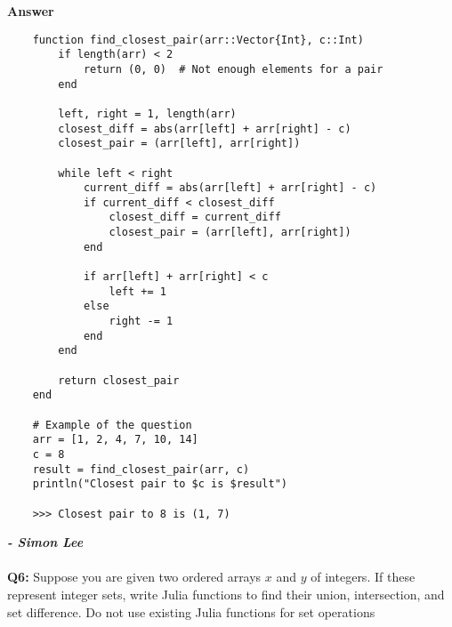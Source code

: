 \documentclass{article}
\begin{document}
\textbf{Answer}

\begin{verbatim}
    function find_closest_pair(arr::Vector{Int}, c::Int)
        if length(arr) < 2
            return (0, 0)  # Not enough elements for a pair
        end
        
        left, right = 1, length(arr)
        closest_diff = abs(arr[left] + arr[right] - c)
        closest_pair = (arr[left], arr[right])
        
        while left < right
            current_diff = abs(arr[left] + arr[right] - c)
            if current_diff < closest_diff
                closest_diff = current_diff
                closest_pair = (arr[left], arr[right])
            end
            
            if arr[left] + arr[right] < c
                left += 1
            else
                right -= 1
            end
        end
        
        return closest_pair
    end
    
    # Example of the question
    arr = [1, 2, 4, 7, 10, 14]
    c = 8
    result = find_closest_pair(arr, c)
    println("Closest pair to $c is $result")

    >>> Closest pair to 8 is (1, 7)
\end{verbatim}

\textbf{\textit{- Simon Lee }} \\\\

\textbf{Q6:} Suppose you are given two ordered arrays $x$ and $y$ of integers. If these represent integer sets, write Julia functions to find their union, intersection, and set difference. Do not use existing Julia functions for set operations 
\end{document}
